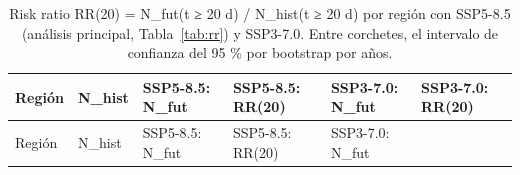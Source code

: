 \begin{longtable}[]{@{}
  >{\raggedright\arraybackslash}p{}
  >{\raggedright\arraybackslash}p{}
  >{\raggedright\arraybackslash}p{}
  >{\raggedright\arraybackslash}p{}
  >{\raggedright\arraybackslash}p{}
  >{\raggedright\arraybackslash}p{}@{}}
\caption{Risk ratio RR(20) = N\_fut(t ≥ 20 d) / N\_hist(t ≥ 20 d) por región con SSP5-8.5 (análisis principal, Tabla~\ref{tab:rr}) y SSP3-7.0. Entre corchetes, el intervalo de confianza del 95 \% por bootstrap por años.}\label{tab:S5}\tabularnewline
\toprule\noalign{}
\begin{minipage}[b]{\linewidth}\raggedright
Región
\end{minipage} & \begin{minipage}[b]{\linewidth}\raggedright
N\_hist
\end{minipage} & \begin{minipage}[b]{\linewidth}\raggedright
SSP5-8.5: N\_fut
\end{minipage} & \begin{minipage}[b]{\linewidth}\raggedright
SSP5-8.5: RR(20)
\end{minipage} & \begin{minipage}[b]{\linewidth}\raggedright
SSP3-7.0: N\_fut
\end{minipage} & \begin{minipage}[b]{\linewidth}\raggedright
SSP3-7.0: RR(20)
\end{minipage} \\
\midrule\noalign{}
\endfirsthead
\toprule\noalign{}
\begin{minipage}[b]{\linewidth}\raggedright
Región
\end{minipage} & \begin{minipage}[b]{\linewidth}\raggedright
N\_hist
\end{minipage} & \begin{minipage}[b]{\linewidth}\raggedright
SSP5-8.5: N\_fut
\end{minipage} & \begin{minipage}[b]{\linewidth}\raggedright
SSP5-8.5: RR(20)
\end{minipage} & \begin{minipage}[b]{\linewidth}\raggedright
SSP3-7.0: N\_fut
\end{minipage} & \begin{minipage}[b]{\linewidth}\raggedright

\end{minipage}
\end{longtable}
